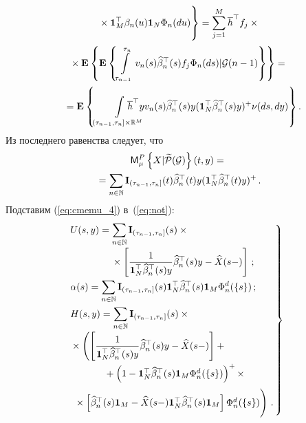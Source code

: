 \begin{multicols}{2}
{\noindent
\begin{multline*}
\left.{}\times
\mathbf{1}_M^{\top}\beta_n(u)\mathbf{1}_N\Phi_n(du)
\vphantom{\int\limits_{\tau_{n-1}}^{\infty}}
\right\}= \sum\limits_{j=1}^M \overline{h}^{\top}f_j\times{}\\
{}\times
\me{}{\me{}{\int\limits_{\tau_{n-1}}^{\tau_{n}}
v_n(s)\widehat{\beta}^{\top}_n(s) f_j\Phi_n(ds)|\G(n-1) }}={}\\
{}= \me{}{ \int\limits_{(\tau_{n-1},\tau_n] \times \mathbb{R}^M}\hspace*{-7mm}
\overline{h}^{\top}y v_n(s)\widehat{\beta}^{\top}_n(s)y (\mathbf{1}_N^{\top}
\widehat{\beta}^{\top}_n(s)y)^+\nu(ds,dy) }.\hspace*{-7.91641pt}
\end{multline*}
Из последнего равенства следует, что
\begin{multline}
\mathsf{M}_{ \mu }^{ P }\left\{ \mathop{X|\widetilde{{\mathcal P}}(\mathcal{G})} \right\}(t,y)={}\\
{}=
\sum\limits_{n \in \mathbb{N}}\mathbf{I}_{(\tau_{n-1},\tau_n]}(t)
\widehat{\beta}^{\top}_n(t)y (\mathbf{1}_N^{\top}\widehat{\beta}^{\top}_n(t)y)^+\,.
\label{eq:cmemu_4}
\end{multline}
Подставим (\ref{eq:cmemu_4}) в~(\ref{eq:not}):
\begin{equation}
\hspace*{-3mm}\left.
\begin{array}{l}
\displaystyle
U(s,y) =\sum\limits_{n \in \mathbb{N}}\mathbf{I}_{(\tau_{n-1},\tau_n]}(s)\times{}\\[12pt]
\hspace*{15mm}{}\times\left[
\fr{1}{\mathbf{1}_N^{\top}\widehat{\beta}^{\top}_n(s)y}
\widehat{\beta}^{\top}_n(s)y-\widehat{X}(s-)
\right]\,;\\[12pt]
\displaystyle
\alpha(s) = \sum\limits_{n \in \mathbb{N}}\mathbf{I}_{(\tau_{n-1},\tau_n]}(s)\mathbf{1}_N^{\top}\widehat{\beta}^{\top}_n(s)\mathbf{1}_M
\Phi_n^d(\{s\})\,;\\[14pt]
\displaystyle
H(s,y) =\sum\limits_{n \in \mathbb{N}}\mathbf{I}_{(\tau_{n-1},\tau_n]}(s)\times{}\\[12pt]
{}\times
\left(\left[
\fr{1}{\mathbf{1}_N^{\top}\widehat{\beta}^{\top}_n(s)y}
\widehat{\beta}^{\top}_n(s)y-\widehat{X}(s-)
\right] + {}\right. \\[12pt]
\hspace*{12mm}\left.{}+
\left( 1 - \mathbf{1}_N^{\top}\widehat{\beta}^{\top}_n(s)
\mathbf{1}_M\Phi_n^d(\{s\})\right)^+{}\times\right.\\[9pt]
\hspace*{1mm}\left.{}\times
\left[
\widehat{\beta}^{\top}_n(s)\mathbf{1}_M -
\widehat{X}(s-) \mathbf{1}_N^{\top}\widehat{\beta}^{\top}_n(s)\mathbf{1}_M
\right]\Phi_n^d(\{s\})
\vphantom{\fr{1}{\mathbf{1}_N^{\top}\widehat{\beta}^{\top}_n(s)y}}
\right)\,.
\end{array}\!\!
\right\}
\label{eq:not_2}
\end{equation}

}
\end{multicols}
